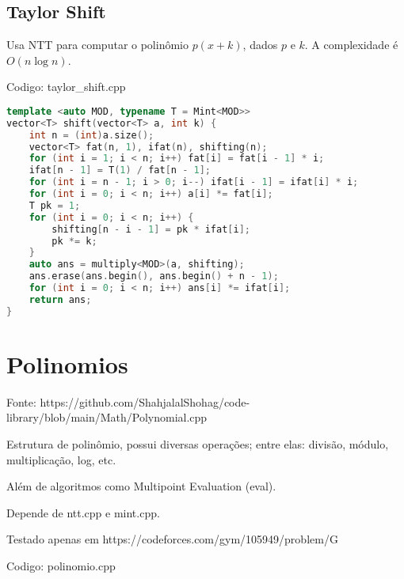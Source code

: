 \documentclass[10pt, a4paper, oneside]{book}
\begin{document}
\subsection{Taylor Shift}


Usa NTT para computar o polinômio $p(x + k)$, dados $p$ e $k$. A complexidade é $O(n \log n)$.
\hfill

Codigo: taylor\_shift.cpp

\begin{lstlisting}[language=C++]
template <auto MOD, typename T = Mint<MOD>>
vector<T> shift(vector<T> a, int k) {
    int n = (int)a.size();
    vector<T> fat(n, 1), ifat(n), shifting(n);
    for (int i = 1; i < n; i++) fat[i] = fat[i - 1] * i;
    ifat[n - 1] = T(1) / fat[n - 1];
    for (int i = n - 1; i > 0; i--) ifat[i - 1] = ifat[i] * i;
    for (int i = 0; i < n; i++) a[i] *= fat[i];
    T pk = 1;
    for (int i = 0; i < n; i++) {
        shifting[n - i - 1] = pk * ifat[i];
        pk *= k;
    }
    auto ans = multiply<MOD>(a, shifting);
    ans.erase(ans.begin(), ans.begin() + n - 1);
    for (int i = 0; i < n; i++) ans[i] *= ifat[i];
    return ans;
}\end{lstlisting}
\hfill

\section{Polinomios}


Fonte: https://github.com/ShahjalalShohag/code-library/blob/main/Math/Polynomial.cpp



Estrutura de polinômio, possui diversas operações; entre elas: divisão, módulo, multiplicação, log, etc. 

Além de algoritmos como Multipoint Evaluation (eval). 



Depende de ntt.cpp e mint.cpp.



Testado apenas em https://codeforces.com/gym/105949/problem/G

\hfill

Codigo: polinomio.cpp
\end{document}
